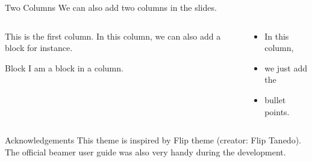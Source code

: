 \documentclass[aspectratio=169]{beamer}
\begin{document}
	\begin{frame}{Two Columns}
		We can also add two columns in the slides.
		\begin{columns}[t]
			\begin{column}[T]{0.4\textwidth}
				This is the first column. In this column, we can also add a block for instance.
				\vspace{1em}
				\begin{block}{Block}
					I am a block in a column.
				\end{block}
			\end{column}
			\begin{column}[T]{0.4\textwidth}
				\begin{itemize}
					\item In this column,
					\item we just add the
					\item bullet points.
				\end{itemize}
			\end{column}
		\end{columns}
	\end{frame}
	\begin{frame}{Acknowledgements}
		This theme is inspired by Flip theme (creator: Flip Tanedo). The official beamer user guide was also very handy during the development.
	\end{frame}
\end{document}
